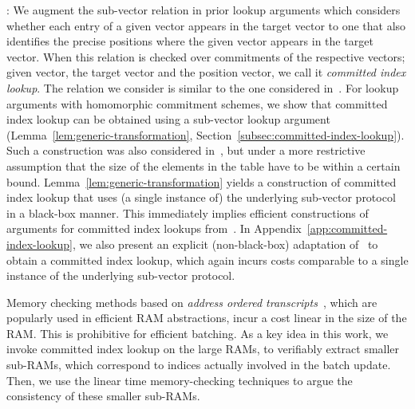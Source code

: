 \smallskip

: We augment the sub-vector relation in prior lookup arguments which
considers whether each entry of a given vector appears in the target vector to one that also identifies
the precise positions where the given vector appears in the target vector. When this relation is checked
over commitments of the respective vectors; given vector, the target vector and the position vector, we call
it {\em committed index lookup}. The relation we consider is similar to the one considered in~\cite{lasso}.
For lookup arguments with homomorphic commitment schemes, we show that committed index lookup can be obtained
using a sub-vector lookup argument (Lemma~\ref{lem:generic-transformation}, Section~\ref{subsec:committed-index-lookup}). Such a construction was
also considered in~\cite{lasso}, but under a more restrictive assumption that the size of the elements in the table have to be
within a certain bound. Lemma~\ref{lem:generic-transformation} yields a construction of committed index lookup that uses (a single instance of) the underlying sub-vector protocol in a black-box manner. This immediately implies
efficient constructions of arguments for committed index lookups from~\cite{CCS:ZBKMNS22,EPRINT:PosKat22,EPRINT:ZGKMR22,EPRINT:EagFioGab22,PKC:CFFLL24}. In Appendix~\ref{app:committed-index-lookup}, we also present an explicit (non-black-box) adaptation of~\cite{EPRINT:PosKat22} to obtain a committed index lookup, which again incurs costs comparable to a single instance of the underlying sub-vector protocol.

\smallskip


Memory checking methods based on {\em address ordered transcripts}~\cite{NDSS:WSRBW15,USENIX:BCTV14,C:BCGTV13,SP:ZGKPP18}, which are popularly used in
efficient RAM abstractions, incur a cost linear in the size of the RAM. This is prohibitive for efficient batching. As a key idea in this work, we invoke committed index lookup on
the large RAMs, to verifiably extract smaller sub-RAMs, which correspond to indices actually involved in
the batch update. Then, we use the linear time memory-checking techniques to argue the consistency of these
smaller sub-RAMs. 

